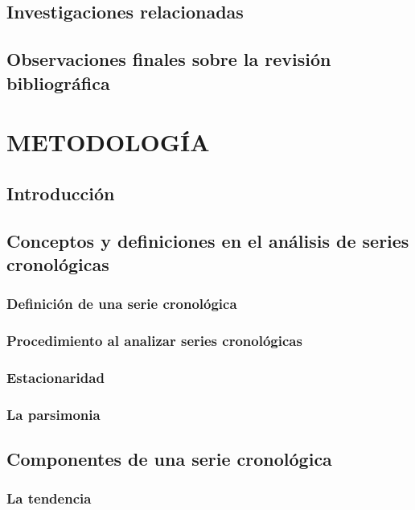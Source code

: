 \documentclass[
]{article}
\begin{document}
\subsection{Investigaciones relacionadas}

\subsection{Observaciones finales sobre la revisión bibliográfica}

\newpage

\section{METODOLOGÍA}

\subsection{Introducción}

\subsection{Conceptos y definiciones en el análisis de series cronológicas}

\subsubsection{Definición de una serie cronológica}

\subsubsection{Procedimiento al analizar series cronológicas}

\subsubsection{Estacionaridad}

\subsubsection{La parsimonia}

\subsection{Componentes de una serie cronológica}

\subsubsection{La tendencia}
\end{document}
